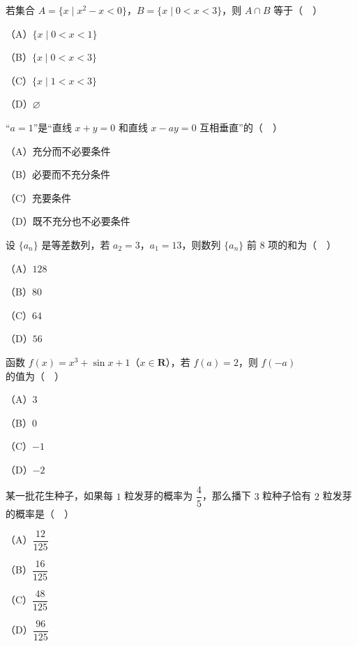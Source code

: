 


\begin{question}
若集合 $A=\{x\mid x^2-x<0\}$，$B=\{x\mid 0<x<3\}$，则 $A\cap B$ 等于（　）

（A）$\{x\mid 0<x<1\}$

（B）$\{x\mid 0<x<3\}$

（C）$\{x\mid 1<x<3\}$

（D）$\varnothing$

\end{question}
\begin{question}
“$a=1$”是“直线 $x+y=0$ 和直线 $x-ay=0$ 互相垂直”的（　）

（A）充分而不必要条件

（B）必要而不充分条件

（C）充要条件

（D）既不充分也不必要条件

\end{question}
\begin{question}
设 $\{a_n\}$ 是等差数列，若 $a_2=3$，$a_1=13$，则数列 $\{a_n\}$ 前 $8$ 项的和为（　）

（A）$128$

（B）$80$

（C）$64$

（D）$56$

\end{question}
\begin{question}
函数 $f(x)=x^3+\sin x+1$（$x\in\mathbf R$），若 $f(a)=2$，则 $f(-a)$ 的值为（　）

（A）$3$

（B）$0$

（C）$-1$

（D）$-2$

\end{question}
\begin{question}
某一批花生种子，如果每 $1$ 粒发芽的概率为 $\dfrac45$，那么播下 $3$ 粒种子恰有 $2$ 粒发芽的概率是（　）

（A）$\dfrac{12}{125}$

（B）$\dfrac{16}{125}$

（C）$\dfrac{48}{125}$

（D）$\dfrac{96}{125}$

\Needspace{0.4\textheight}
\end{question}
